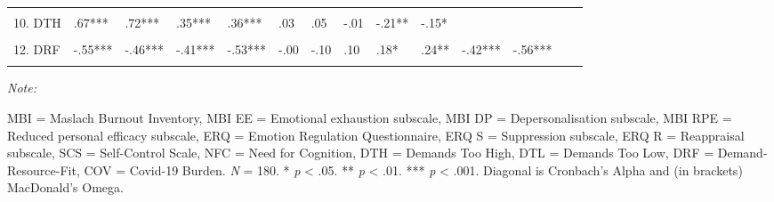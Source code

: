 \documentclass[
  english,
  man,floatsintext]{apa6}
\begin{document}
\begin{landscape}
\begin{table}
{\begin{threeparttable}
\begin{tabular}[t]{llllllllllllll}
\cellcolor{gray!6}{9. NFC} & \cellcolor{gray!6}{-.25***} & \cellcolor{gray!6}{-.20**} & \cellcolor{gray!6}{-.22**} & \cellcolor{gray!6}{-.21**} & \cellcolor{gray!6}{-.01} & \cellcolor{gray!6}{-.18*} & \cellcolor{gray!6}{.16*} & \cellcolor{gray!6}{.22**} & \cellcolor{gray!6}{} & \cellcolor{gray!6}{} & \cellcolor{gray!6}{} & \cellcolor{gray!6}{} & \cellcolor{gray!6}{}\\
10. DTH & .67*** & .72*** & .35*** & .36*** & .03 & .05 & -.01 & -.21** & -.15* &  &  &  & \\
\addlinespace
\cellcolor{gray!6}{11. DTL} & \cellcolor{gray!6}{.44***} & \cellcolor{gray!6}{.36***} & \cellcolor{gray!6}{.38***} & \cellcolor{gray!6}{.43***} & \cellcolor{gray!6}{.01} & \cellcolor{gray!6}{.16*} & \cellcolor{gray!6}{-.14} & \cellcolor{gray!6}{-.19*} & \cellcolor{gray!6}{-.16*} & \cellcolor{gray!6}{.41***} & \cellcolor{gray!6}{} & \cellcolor{gray!6}{} & \cellcolor{gray!6}{}\\
12. DRF & -.55*** & -.46*** & -.41*** & -.53*** & -.00 & -.10 & .10 & .18* & .24** & -.42*** & -.56*** &  & \\
\cellcolor{gray!6}{13. COV} & \cellcolor{gray!6}{.24**} & \cellcolor{gray!6}{.32***} & \cellcolor{gray!6}{.08} & \cellcolor{gray!6}{.02} & \cellcolor{gray!6}{-.03} & \cellcolor{gray!6}{.02} & \cellcolor{gray!6}{-.07} & \cellcolor{gray!6}{-.04} & \cellcolor{gray!6}{.13} & \cellcolor{gray!6}{.45***} & \cellcolor{gray!6}{.10} & \cellcolor{gray!6}{-.13} & \cellcolor{gray!6}{}\\
\bottomrule
\end{tabular}
\begin{tablenotes}
\item \textit{Note: } 
\item MBI = Maslach Burnout Inventory, MBI EE = Emotional exhaustion subscale, MBI DP = Depersonalisation subscale, MBI RPE = Reduced personal efficacy subscale, ERQ = Emotion Regulation Questionnaire, ERQ S = Suppression subscale, ERQ R = Reappraisal subscale, SCS = Self-Control Scale, NFC = Need for Cognition, DTH = Demands Too High, DTL = Demands Too Low, DRF = Demand-Resource-Fit, COV = Covid-19 Burden. \textit{N} = 180. * \textit{p} < .05. ** \textit{p} < .01. *** \textit{p} < .001. Diagonal is Cronbach's Alpha and (in brackets) MacDonald's Omega.
\end{tablenotes}
\end{threeparttable}}
\end{table}
\end{landscape}
\end{document}
